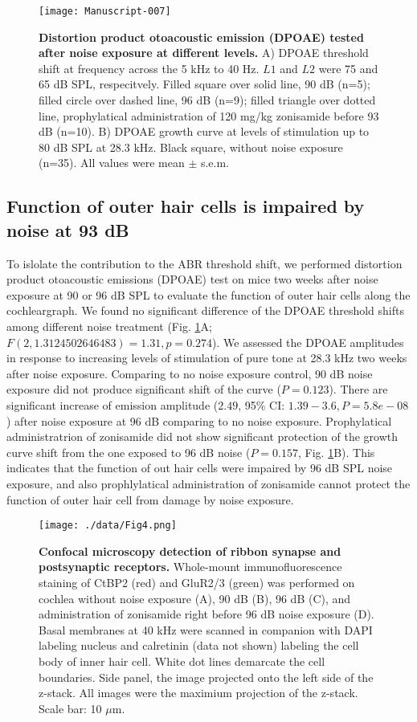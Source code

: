 \documentclass[11pt]{article}
\begin{document}
\begin{figure}[ht!]
\centering
\texttt{[image: Manuscript-007]}
\caption{{\bf {Distortion product otoacoustic emission (DPOAE) tested after noise exposure at different levels.}} A) DPOAE threshold shift at frequency across the 5 kHz to 40 Hz. $L1$ and $L2$ were 75 and 65 dB SPL, respecitvely. Filled square over solid line, 90 dB (n=5); filled circle over dashed line, 96 dB (n=9); filled triangle over dotted line, prophylatical administration of 120 mg/kg zonisamide before 93 dB (n=10). B) DPOAE growth curve at levels of stimulation up to 80 dB SPL at 28.3 kHz. Black square, without noise exposure (n=35). All values were  mean $\pm$ s.e.m. }
\label{fig:Figure3}
\end{figure}

\subsection {Function of outer hair cells is impaired by noise at 93 dB}
To islolate the contribution to the ABR threshold shift, we performed distortion product otoacoustic emissions (DPOAE) test on mice two weeks after noise exposure at 90 or 96 dB SPL to evaluate the function of outer hair cells along the cochleargraph. We found no significant difference of the DPOAE threshold shifts among different noise treatment 
(Fig. \ref{fig:Figure3}A; $F(2,1.3124502646483)=1.31,
 p=0.274$). We assessed the DPOAE amplitudes in response to increasing levels of stimulation of pure tone at 28.3 kHz two weeks after noise exposure. Comparing to no noise exposure control, 90 dB noise exposure did not produce significant shift of the curve 
($P=0.123$). There are significant increase of emission amplitude ($2.49$, 95\% CI: $1.39 - 3.6, P= 5.8e-08$) after noise exposure at 96 dB comparing to no noise exposure. Prophylatical administratrion of zonisamide did not show significant protection of the growth curve shift from the one exposed to 96 dB noise ($P=0.157$, Fig. \ref{fig:Figure3}B).  
 This indicates that the function of out hair cells were impaired by 96 dB SPL noise exposure, and also prophlylatical administration of zonisamide cannot protect the function of outer hair cell from damage by noise exposure.

\begin{figure}[ht!]
\centering
\texttt{[image: ./data/Fig4.png]}
\caption{{\bf {Confocal microscopy detection of ribbon synapse and postsynaptic receptors.}}  Whole-mount immunofluorescence staining of CtBP2 (red) and GluR2/3 (green) was performed on cochlea without noise exposure (A), 90 dB (B), 96 dB (C), and administration of zonisamide right before 96 dB noise exposure (D). Basal membranes at 40 kHz were scanned in companion with DAPI labeling nucleus and calretinin (data not shown) labeling the cell body of inner hair cell. White dot lines demarcate the cell boundaries. Side panel, the image projected onto the left side of the z-stack. All images were the maximium projection of the z-stack. Scale bar: 10 $\mu$m. }
\label{fig:Figure4}
\end{figure}
\end{document}
